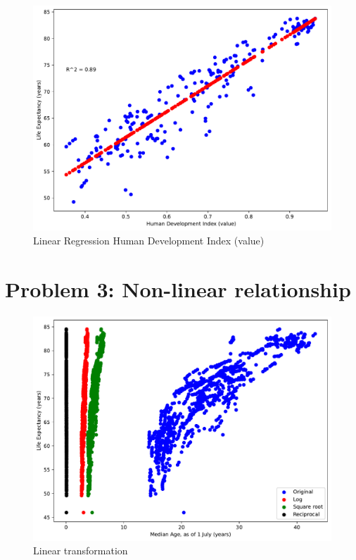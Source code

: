 \documentclass[a4paper]{article}
\begin{document}
\begin{figure}[h]
  \begin{center}
    \includegraphics[width=\textwidth]{ola/_linear_regression_human_development_index_(value).pdf}
    \caption{Linear Regression Human Development Index (value)}
    \label{fig:reg_human_development_index}
  \end{center}
\end{figure}

\section*{Problem 3: Non-linear relationship}

\begin{figure}[h]
  \begin{center}
    \includegraphics[width=\textwidth]{ola/linear_transformation.pdf}
    \caption{Linear transformation}
    \label{fig:linear_transformation}
  \end{center}
\end{figure}
\end{document}
